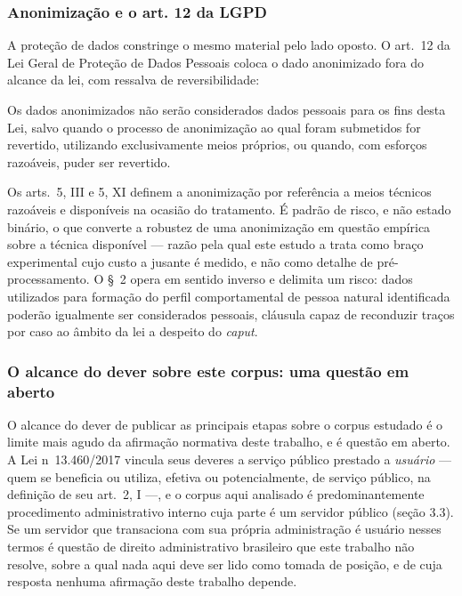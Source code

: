 \subsubsection{Anonimização e o art. 12 da LGPD}

A proteção de dados constringe o mesmo material pelo lado oposto. O art.~12 da Lei Geral de
Proteção de Dados Pessoais coloca o dado anonimizado fora do alcance da lei, com ressalva de
reversibilidade:

\begin{citacao}
Os dados anonimizados não serão considerados dados pessoais para os fins desta Lei, salvo quando o
processo de anonimização ao qual foram submetidos for revertido, utilizando exclusivamente meios
próprios, ou quando, com esforços razoáveis, puder ser revertido.
\cite[art.~12]{brasil2018lgpd}
\end{citacao}

\noindent Os arts.~5\textordmasculine{}, III e 5\textordmasculine{}, XI definem a anonimização por
referência a meios técnicos razoáveis e disponíveis na ocasião do tratamento. É padrão de risco, e
não estado binário, o que converte a robustez de uma anonimização em questão empírica sobre a
técnica disponível --- razão pela qual este estudo a trata como braço experimental cujo custo
a jusante é medido, e não como detalhe de pré-processamento. O \S~2\textordmasculine{} opera em
sentido inverso e delimita um risco: dados utilizados para formação do perfil comportamental de
pessoa natural identificada poderão igualmente ser considerados pessoais, cláusula capaz de
reconduzir traços por caso ao âmbito da lei a despeito do \emph{caput}.

\subsubsection{O alcance do dever sobre este corpus: uma questão em aberto}
\label{sec:rev-alcance}

O alcance do dever de publicar as principais etapas sobre o corpus estudado é o limite mais agudo da
afirmação normativa deste trabalho, e é questão em aberto. A Lei n\textordmasculine{}~13.460/2017
vincula seus deveres a
serviço público prestado a \emph{usuário} --- quem se beneficia ou utiliza, efetiva ou
potencialmente, de serviço público, na definição de seu art.~2\textordmasculine{}, I ---, e o corpus
aqui analisado é predominantemente procedimento administrativo interno cuja parte é um servidor
público (seção 3.3). Se um servidor que transaciona com sua própria administração é usuário nesses
termos é questão de direito administrativo brasileiro que este trabalho não resolve, sobre a qual
nada aqui deve ser lido como tomada de posição, e de cuja resposta nenhuma afirmação deste trabalho
depende.

